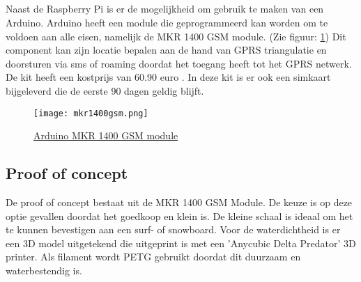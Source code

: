 \subsection{}
Naast de Raspberry Pi is er de mogelijkheid om gebruik te maken van een Arduino. Arduino heeft een module die geprogrammeerd kan worden om te voldoen aan alle eisen, namelijk de MKR 1400 GSM module. (Zie figuur: \ref{fig:mkr1400}) Dit component kan zijn locatie bepalen aan de hand van GPRS triangulatie en doorsturen via sms of roaming doordat het toegang heeft tot het GPRS netwerk. De kit heeft een kostprijs van 60.90 euro \autocite{arduino}. In deze kit is er ook een simkaart bijgeleverd die de eerste 90 dagen geldig blijft.
\begin{figure}
    \texttt{[image: mkr1400gsm.png]}
    \caption{\href{https://store.arduino.cc/arduino-sim-mkr-gsm-1400-cellular-kit-1417?fbclid=IwAR0kJk6t6PVON-YakV_EiSOnb5y2RgBRQW0c6pVmpRw-hJlPRHO99qDdjSA}{Arduino MKR 1400 GSM module}}
    \label{fig:mkr1400}
\end{figure}
\subsection{Proof of concept}
De proof of concept bestaat uit de MKR 1400 GSM Module. De keuze is op deze optie gevallen doordat het goedkoop en klein is. De kleine schaal is ideaal om het te kunnen bevestigen aan een surf- of snowboard. Voor de waterdichtheid is er een 3D model uitgetekend die uitgeprint is met een 'Anycubic Delta Predator' 3D printer. Als filament wordt PETG gebruikt doordat dit duurzaam en waterbestendig is.